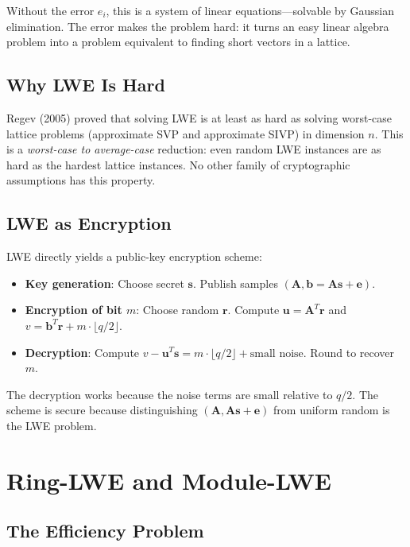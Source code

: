 \documentclass[11pt,a4paper]{article}
\begin{document}
Without the error $e_i$, this is a system of linear equations---solvable by Gaussian
elimination. The error makes the problem hard: it turns an easy linear algebra problem
into a problem equivalent to finding short vectors in a lattice.

\subsection{Why LWE Is Hard}

Regev (2005) proved that solving LWE is at least as hard as solving worst-case lattice
problems (approximate SVP and approximate SIVP) in dimension $n$. This is a
\emph{worst-case to average-case} reduction: even random LWE instances are as hard as
the hardest lattice instances. No other family of cryptographic assumptions has this
property.

\subsection{LWE as Encryption}

LWE directly yields a public-key encryption scheme:

\begin{itemize}[nosep]
  \item \textbf{Key generation}: Choose secret $\mathbf{s}$. Publish samples
    $(\mathbf{A}, \mathbf{b} = \mathbf{A}\mathbf{s} + \mathbf{e})$.
  \item \textbf{Encryption of bit $m$}: Choose random $\mathbf{r}$. Compute
    $\mathbf{u} = \mathbf{A}^T \mathbf{r}$ and $v = \mathbf{b}^T \mathbf{r} + m \cdot \lfloor q/2 \rfloor$.
  \item \textbf{Decryption}: Compute $v - \mathbf{u}^T \mathbf{s} = m \cdot \lfloor q/2 \rfloor + \text{small noise}$.
    Round to recover $m$.
\end{itemize}

The decryption works because the noise terms are small relative to $q/2$. The scheme is
secure because distinguishing $(\mathbf{A}, \mathbf{A}\mathbf{s} + \mathbf{e})$ from
uniform random is the LWE problem.

\section{Ring-LWE and Module-LWE}

\subsection{The Efficiency Problem}
\end{document}

